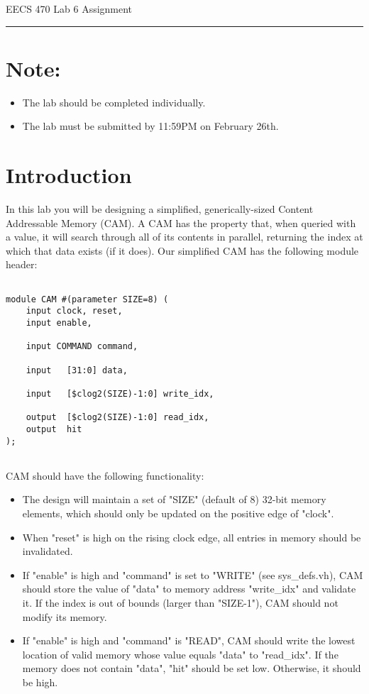 \documentclass{article}
\newcommand{\shortbar}{
	\vspace*{-12pt}
	\begin{center}
		\rule{5ex}{0.1pt}
	\end{center}
}
\newcommand{\lab}[1]{
	\begin{center}
		\LARGE{
			\vspace*{-12pt}
			EECS 470 Lab #1 Assignment
			\shortbar
		}
	\end{center}
}
\begin{document}
\vspace*{-20pt}
\lab{6}
\vspace*{-20pt}

\section*{Note:}
\begin{itemize}
	\item The lab should be completed individually.
	\item The lab must be submitted by 11:59PM on February 26th.
\end{itemize}

\section{Introduction}
In this lab you will be designing a simplified, generically-sized Content Addressable Memory (CAM). A CAM has the property that, when queried with a value, it will search through all of its contents in parallel, returning the index at which that data exists (if it does). Our simplified CAM has the following module header:

\begin{lstlisting}

module CAM #(parameter SIZE=8) (
	input clock, reset,
	input enable,
	
	input COMMAND command,
	
	input	[31:0] data,
	
	input	[$clog2(SIZE)-1:0] write_idx,
	
	output	[$clog2(SIZE)-1:0] read_idx,
	output	hit
);
	
\end{lstlisting}

CAM should have the following functionality:

\begin{itemize}
	\item The design will maintain a set of "SIZE" (default of 8) 32-bit memory elements, which should only be updated on the positive edge of "clock".
	\item When "reset" is high on the rising clock edge, all entries in memory should be invalidated.
	\item If "enable" is high and "command" is set to "WRITE" (see sys\_defs.vh), CAM should store the value of "data" to memory address "write\_idx" and validate it. If the index is out of bounds (larger than "SIZE-1"), CAM should not modify its memory.
	\item If "enable" is high and "command" is "READ", CAM should write the lowest location of valid memory whose value equals "data" to "read\_idx". If the memory does not contain "data", "hit" should be set low. Otherwise, it should be high.
\end{itemize}
\end{document}

